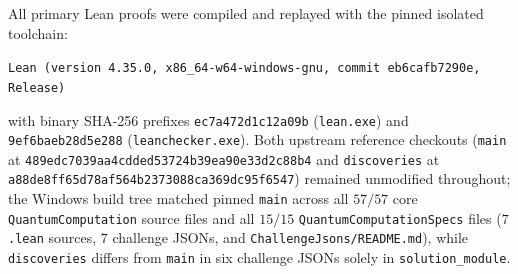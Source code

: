 \documentclass[11pt,a4paper]{article}
\theoremstyle{definition}
\theoremstyle{remark}
\begin{document}
All primary Lean proofs were compiled and replayed with the pinned isolated toolchain:
\begin{center}\footnotesize\texttt{Lean (version 4.35.0, x86\_64-w64-windows-gnu, commit eb6cafb7290e, Release)}\end{center}
with binary SHA-256 prefixes \texttt{ec7a472d\allowbreak 1c12a09b} (\texttt{lean.exe}) and \texttt{9ef6baeb\allowbreak 28d5e288} (\texttt{lean\allowbreak checker.exe}). Both upstream reference checkouts (\texttt{main} at \texttt{489edc70\allowbreak 39aa4cdd\allowbreak ed53724b\allowbreak 39ea90e3\allowbreak 3d2c88b4} and \texttt{discoveries} at \texttt{a88de8ff\allowbreak 65d78af5\allowbreak 64b23730\allowbreak 88ca369d\allowbreak c95f6547}) remained unmodified throughout; the Windows build tree matched pinned \texttt{main} across all \(57/57\) core \texttt{Quantum\allowbreak Computation} source files and all \(15/15\) \texttt{Quantum\allowbreak Computation\allowbreak Specs} files (\(7\) \texttt{.lean} sources, \(7\) challenge JSONs, and \texttt{ChallengeJsons/README.md}), while \texttt{discoveries} differs from \texttt{main} in six challenge JSONs solely in \texttt{solution\_\allowbreak module}.
\end{document}
